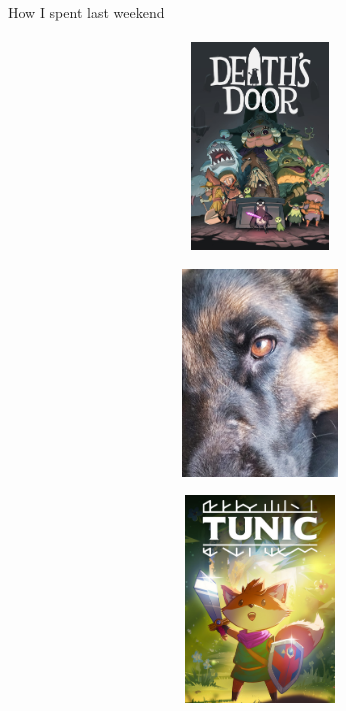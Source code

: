 \documentclass[aspectratio=169]{beamer}
\begin{document}
\begin{frame}[c]{How I spent last weekend}
    \framesubtitle{}
    \begin{figure}[H]
        \begin{subfigure}{0.29\textwidth}
            \centering\includegraphics[height=5.5cm,width=1\textwidth,keepaspectratio]{death_door.jpg}
        \end{subfigure}
        \hfill
        \begin{subfigure}{0.29\textwidth}
            \centering\includegraphics[height=5.5cm,width=1\textwidth,keepaspectratio]{yarik.jpg}
        \end{subfigure}        
        \hfill
        \begin{subfigure}{0.29\textwidth}
            \centering\includegraphics[height=5.5cm,width=1\textwidth,keepaspectratio]{tunic_game.jpeg}
        \end{subfigure}
    \end{figure}
\end{frame}
\end{document}

